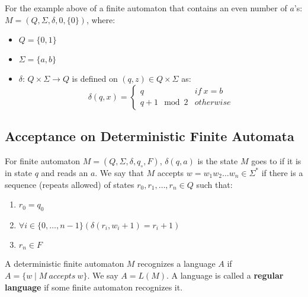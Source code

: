 \documentclass[letterpaper, 12pt]{math}
\begin{document}
For the example above of a finite automaton that contains an even number of
\( a \)'s: \( M = (Q,\Sigma,\delta,0,\{0\}) \), where:
\begin{itemize}
  \item \( Q = \{0,1\} \)
  \item \( \Sigma = \{a,b\} \)
  \item \( \delta \): \( Q\times\Sigma\to Q \) is defined on \( (q,z)\in
    Q\times\Sigma \) as:
    \[ \delta(q,x) = \begin{cases}
      q & if\ x = b \\
      q+1\mod2 & otherwise
    \end{cases} \]
\end{itemize}

\subsection*{Acceptance on Deterministic Finite Automata}
For finite automaton \( M = (Q,\Sigma,\delta,q_{\circ},F) \), \( \delta(q,a) \)
is the state \( M \) goes to if it is in state \( q \) and reads an \( a \).
We say that \( M \) accepts \( w = w_1w_2\dots w_n\in\Sigma^{*} \) if there is
a sequence (repeats allowed) of states \( r_0,r_1,\dots,r_n\in Q \) such that:
\begin{enumerate}
  \item \( r_0 = q_0 \)
  \item \( \forall{i}\in\{0,\dots,n-1\}(\delta(r_i,w_i+1) = r_i+1) \)
  \item \( r_n \in F \)
\end{enumerate}
A deterministic finite automaton \( M \) recognizes a language \( A \) if
\( A = \{w\mid M\ accepts\ w\} \). We say \( A = L(M) \). A language is called
a \textbf{regular language} if some finite automaton recognizes it.
\end{document}
